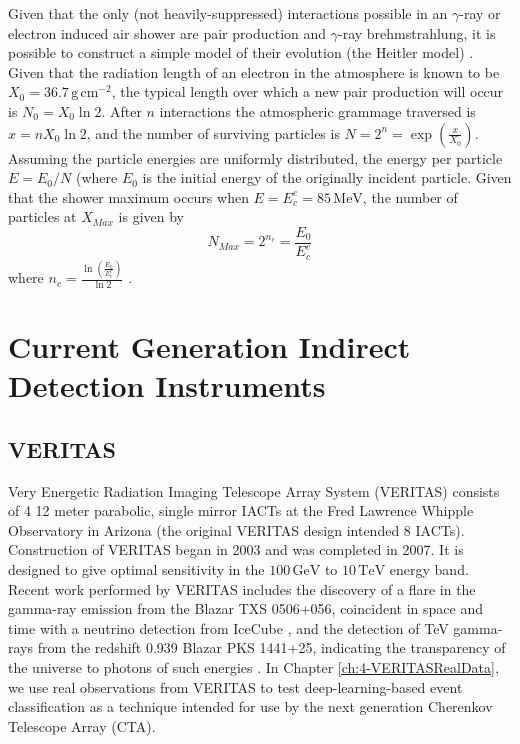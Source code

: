 Given that the only (not heavily-suppressed) interactions possible in an $\gamma$-ray or electron induced air shower are pair production and $\gamma$-ray brehmstrahlung, it is possible to construct a simple model of their evolution (the Heitler model) \cite{heitler}. Given that the radiation length of an electron in the atmosphere is known to be $X_0=\mathrm{36.7\,g\,cm^{-2}}$, the typical length over which a new pair production will occur is $N_0=X_0 \ln 2$. After $n$ interactions the atmospheric grammage traversed is $x=nX_0 \ln 2$, and the number of surviving particles is $N=2^n=\exp \left( \frac{x}{X_0}\right)$. Assuming the particle energies are uniformly distributed, the energy per particle $E=E_0/N$ (where $E_0$ is the initial energy of the originally incident particle. Given that the shower maximum occurs when $E=E_c^e=\mathrm{85\,MeV}$, the number of particles at $X_{Max}$ is given by 
\begin{equation}
    N_{Max}=2^{n_c}=\frac{E_0}{E_c^e}
\end{equation}
where $n_c=\frac{\ln (\frac{E_0}{E_e^c})}{\ln 2}$ \cite{heitler}.

\section{Current Generation Indirect Detection Instruments}
\subsection{VERITAS}
Very Energetic Radiation Imaging Telescope Array System (VERITAS) consists of 4 12 meter parabolic, single mirror IACTs at the Fred Lawrence Whipple Observatory in Arizona (the original VERITAS design intended 8 IACTs). Construction of VERITAS began in 2003 and was completed in 2007. It is designed to give optimal sensitivity in the $\mathrm{100\,GeV}$ to $\mathrm{10\,TeV}$ energy band. Recent work performed by VERITAS includes the discovery of a flare in the gamma-ray emission from the Blazar TXS 0506+056, coincident in space and time with a neutrino detection from IceCube \cite{TXS}, and the detection of TeV gamma-rays from the redshift 0.939 Blazar PKS 1441+25, indicating the transparency of the universe to photons of such energies \cite{escape}. In Chapter \ref{ch:4-VERITASRealData}, we use real observations from VERITAS to test deep-learning-based event classification as a technique intended for use by the next generation Cherenkov Telescope Array (CTA).


